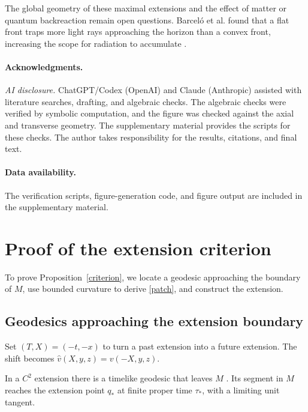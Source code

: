 \documentclass[12pt]{article}
\begin{document}
\begin{samepage}
The global geometry of these maximal extensions and the effect of matter
or quantum backreaction remain open questions. Barcel\'o et al. found that
a flat front traps more light rays approaching the horizon than a convex
front, increasing the scope for radiation to accumulate
\cite[Sec.~3.3]{BarceloEtAl2022}.
\par
\end{samepage}

\paragraph{Acknowledgments.}
\textit{AI disclosure.} ChatGPT/Codex (OpenAI) and Claude (Anthropic)
assisted with literature searches, drafting, and algebraic checks.
The algebraic checks were verified by symbolic computation, and the
figure was checked against the axial and transverse geometry. The
supplementary material provides the scripts for these checks. The
author takes responsibility for the results, citations, and final text.

\paragraph{Data availability.}
The verification scripts, figure-generation code, and figure output
are included in the supplementary material.

\appendix
{}
\section{Proof of the extension criterion}
\label{app:criterion}

To prove Proposition~\ref{criterion}, we locate a geodesic approaching the
boundary of \(M\), use bounded curvature to derive \eqref{patch}, and
construct the extension.

\subsection{Geodesics approaching the extension boundary}

Set \((T,X)=(-t,-x)\) to turn a past extension into a future extension.
The shift becomes \(\widehat v(X,y,z)=v(-X,y,z)\).

In a \(C^2\) extension there is a timelike geodesic that leaves \(M\)
\cite[Lemma~3.2 and following paragraph]{GallowayLingSbierski2018}.
Its segment in \(M\) reaches the extension point \(q_*\) at finite
proper time \(\tau_*\), with a limiting unit tangent.
\end{document}
